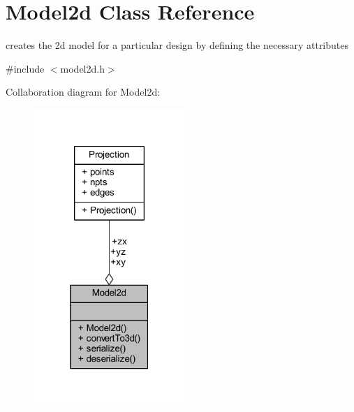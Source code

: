 \hypertarget{class_model2d}{}\section{Model2d Class Reference}
\label{class_model2d}


creates the 2d model for a particular design by defining the necessary attributes  




{\ttfamily \#include $<$model2d.\+h$>$}



Collaboration diagram for Model2d\+:\nopagebreak
\begin{figure}[H]
\begin{center}
\leavevmode
\includegraphics[width=163pt]{class_model2d__coll__graph}
\end{center}
\end{figure}
